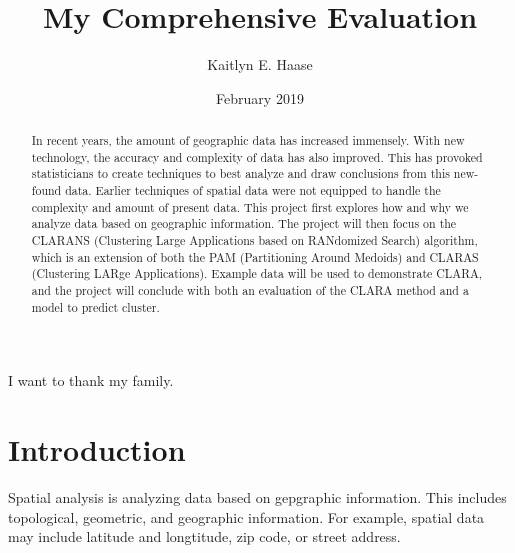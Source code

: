 \documentclass[12pt,twoside]{amherstthesis}
\title{My Comprehensive Evaluation}
\author{Kaitlyn E. Haase}
\date{February 2019}
\begin{document}
      \maketitle
  
  \frontmatter %
  \pagestyle{empty} %

      \begin{acknowledgements}
      I want to thank my family.
    \end{acknowledgements}
  
  

      \hypersetup{linkcolor=black}
    \setcounter{tocdepth}{2}
    \tableofcontents
  
      \listoftables
  
      \listoffigures
  
      \begin{abstract}
      In recent years, the amount of geographic data has increased immensely.
      With new technology, the accuracy and complexity of data has also
      improved. This has provoked statisticians to create techniques to best
      analyze and draw conclusions from this new-found data. Earlier
      techniques of spatial data were not equipped to handle the complexity
      and amount of present data. This project first explores how and why we
      analyze data based on geographic information. The project will then
      focus on the CLARANS (Clustering Large Applications based on RANdomized
      Search) algorithm, which is an extension of both the PAM (Partitioning
      Around Medoids) and CLARAS (Clustering LARge Applications). Example data
      will be used to demonstrate CLARA, and the project will conclude with
      both an evaluation of the CLARA method and a model to predict cluster.
    \end{abstract}
  
  
  \mainmatter %
  \pagestyle{fancyplain} %

  \onehalfspacing
  
  \chapter*{Introduction}\label{introduction}
  
  Spatial analysis is analyzing data based on gepgraphic information. This
  includes topological, geometric, and geographic information. For
  example, spatial data may include latitude and longtitude, zip code, or
  street address.
  
\end{document}
